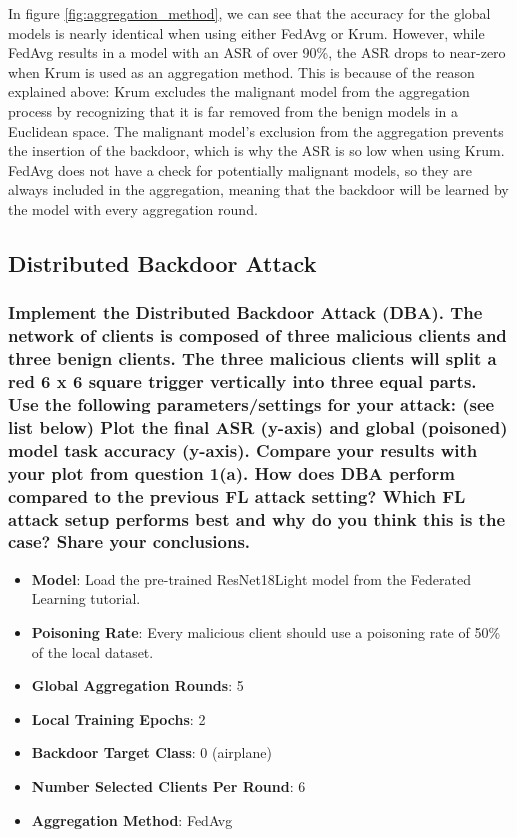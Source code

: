 \documentclass{article}
\begin{document}
In figure \ref{fig:aggregation_method}, we can see that the accuracy for the global models is nearly identical when using either FedAvg or Krum.
However, while FedAvg results in a model with an ASR of over 90\%, the ASR drops to near-zero when Krum is used as an aggregation method.
This is because of the reason explained above: Krum excludes the malignant model from the aggregation process by recognizing that it is far removed from the benign models in a Euclidean space.
The malignant model's exclusion from the aggregation prevents the insertion of the backdoor, which is why the ASR is so low when using Krum.
FedAvg does not have a check for potentially malignant models, so they are always included in the aggregation, meaning that the backdoor will be learned by the model with every aggregation round.

\subsection{Distributed Backdoor Attack}
\subsubsection{Implement the Distributed Backdoor Attack (DBA). The network
of clients is composed of three malicious clients and three benign clients. The
three malicious clients will split a red 6 x 6 square trigger vertically into three
equal parts. Use the following parameters/settings for your attack: (see list below)
Plot the final ASR (y-axis) and global (poisoned) model task accuracy (y-axis).
Compare your results with your plot from question 1(a). How does DBA perform
compared to the previous FL attack setting? Which FL attack setup performs
best and why do you think this is the case? Share your conclusions.}
\begin{itemize}
    \item \textbf{Model}: Load the pre-trained ResNet18Light model from the Federated
    Learning tutorial.
    \item \textbf{Poisoning Rate}: Every malicious client should use a poisoning rate of
    50\% of the local dataset.
    \item \textbf{Global Aggregation Rounds}: 5
    \item \textbf{Local Training Epochs}: 2
    \item \textbf{Backdoor Target Class}: 0 (airplane)
    \item \textbf{Number Selected Clients Per Round}: 6
    \item \textbf{Aggregation Method}: FedAvg
\end{itemize}
\end{document}
